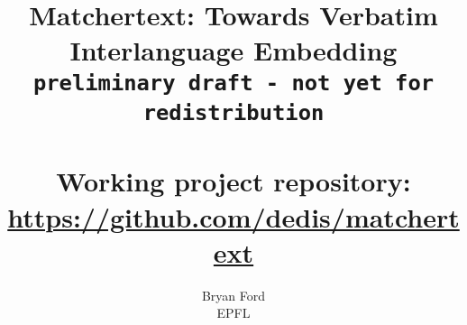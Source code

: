 \documentclass[fullpage,twocolumn]{article}
\begin{document}
\title{Matchertext: Towards Verbatim Interlanguage Embedding \\
	\Large{\texttt{preliminary draft - not yet for redistribution} \\
	~\\
	Working project repository: \url{https://github.com/dedis/matchertext}}}

\author{Bryan Ford \\ EPFL}

\maketitle

\tableofcontents













\arxiv{

}{

}
\end{document}
